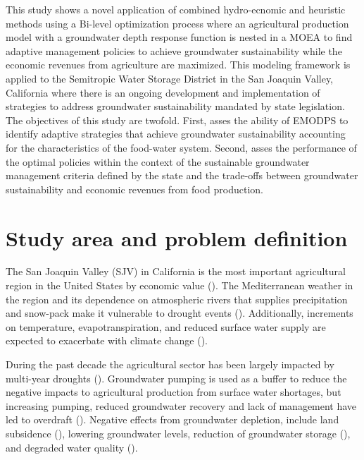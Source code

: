 \documentclass[11pt,a4paper]{article}
\begin{document}
This study shows a novel application of combined hydro-ecnomic and heuristic methods using a Bi-level optimization process where an agricultural production model with a groundwater depth response function is nested in a MOEA to find adaptive management policies to achieve groundwater sustainability while the economic revenues from agriculture are maximized.  This modeling framework is applied to the Semitropic Water Storage District in the San Joaquin Valley, California where there is an ongoing development and implementation of strategies to address groundwater sustainability mandated by state legislation. The objectives of this study are twofold. First, asses the ability of EMODPS to identify adaptive strategies that achieve groundwater sustainability accounting for the characteristics of the food-water system. Second, asses the performance of the optimal policies within the context of the sustainable groundwater management criteria defined by the state and the trade-offs between groundwater sustainability and economic revenues from food production. 

\section{Study area and problem definition}

The San Joaquin Valley (SJV) in California is the most important agricultural region in the United States by economic value (\cite{usda_national_2020}). The Mediterranean weather in the region and its dependence on atmospheric rivers that supplies precipitation and snow-pack make it vulnerable to drought events (\cite{espinoza_global_2018}). Additionally, increments on temperature, evapotranspiration, and reduced surface water supply are expected to exacerbate with climate change (\cite{fernandez-bou_regional_2021}).

During the past decade the agricultural sector has been largely impacted by multi-year droughts (\cite{lund_lessons_2018,medellin-azuara_economic_2022}). Groundwater pumping is used as a buffer to reduce the negative impacts to agricultural production from surface water shortages, but increasing pumping, reduced groundwater recovery and lack of management have led to overdraft  (\cite{liu_groundwater_2022}). Negative effects from groundwater depletion, include land subsidence (\cite{ojha_sustained_2018}), lowering groundwater levels, reduction of groundwater storage (\cite{alam_post-drought_2021}), and degraded water quality (\cite{levy_critical_2021}).  
 
\end{document}
